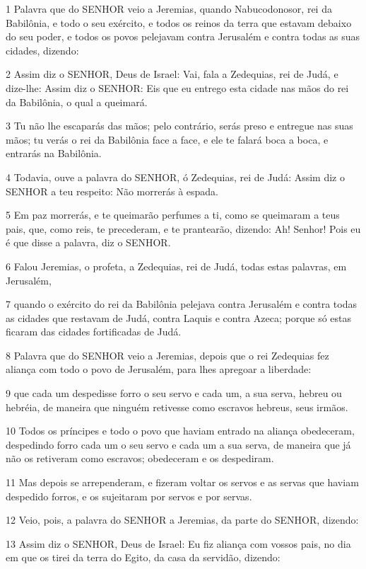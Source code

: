 \par 1 Palavra que do SENHOR veio a Jeremias, quando Nabucodonosor, rei da Babilônia, e todo o seu exército, e todos os reinos da terra que estavam debaixo do seu poder, e todos os povos pelejavam contra Jerusalém e contra todas as suas cidades, dizendo:
\par 2 Assim diz o SENHOR, Deus de Israel: Vai, fala a Zedequias, rei de Judá, e dize-lhe: Assim diz o SENHOR: Eis que eu entrego esta cidade nas mãos do rei da Babilônia, o qual a queimará.
\par 3 Tu não lhe escaparás das mãos; pelo contrário, serás preso e entregue nas suas mãos; tu verás o rei da Babilônia face a face, e ele te falará boca a boca, e entrarás na Babilônia.
\par 4 Todavia, ouve a palavra do SENHOR, ó Zedequias, rei de Judá: Assim diz o SENHOR a teu respeito: Não morrerás à espada.
\par 5 Em paz morrerás, e te queimarão perfumes a ti, como se queimaram a teus pais, que, como reis, te precederam, e te prantearão, dizendo: Ah! Senhor! Pois eu é que disse a palavra, diz o SENHOR.
\par 6 Falou Jeremias, o profeta, a Zedequias, rei de Judá, todas estas palavras, em Jerusalém,
\par 7 quando o exército do rei da Babilônia pelejava contra Jerusalém e contra todas as cidades que restavam de Judá, contra Laquis e contra Azeca; porque só estas ficaram das cidades fortificadas de Judá.
\par 8 Palavra que do SENHOR veio a Jeremias, depois que o rei Zedequias fez aliança com todo o povo de Jerusalém, para lhes apregoar a liberdade:
\par 9 que cada um despedisse forro o seu servo e cada um, a sua serva, hebreu ou hebréia, de maneira que ninguém retivesse como escravos hebreus, seus irmãos.
\par 10 Todos os príncipes e todo o povo que haviam entrado na aliança obedeceram, despedindo forro cada um o seu servo e cada um a sua serva, de maneira que já não os retiveram como escravos; obedeceram e os despediram.
\par 11 Mas depois se arrependeram, e fizeram voltar os servos e as servas que haviam despedido forros, e os sujeitaram por servos e por servas.
\par 12 Veio, pois, a palavra do SENHOR a Jeremias, da parte do SENHOR, dizendo:
\par 13 Assim diz o SENHOR, Deus de Israel: Eu fiz aliança com vossos pais, no dia em que os tirei da terra do Egito, da casa da servidão, dizendo:

